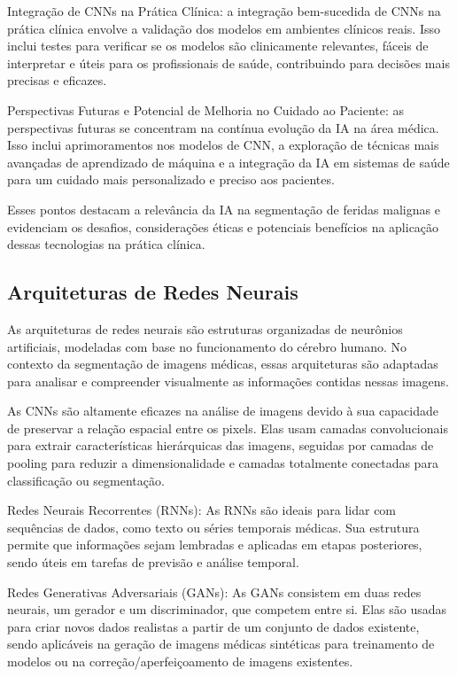 Integração de \ac{CNNs} na Prática Clínica: a integração bem-sucedida de \ac{CNNs} na prática clínica envolve a validação dos modelos em ambientes clínicos reais. Isso inclui testes para verificar se os modelos são clinicamente relevantes, fáceis de interpretar e úteis para os profissionais de saúde, contribuindo para decisões mais precisas e eficazes.

Perspectivas Futuras e Potencial de Melhoria no Cuidado ao Paciente: as perspectivas futuras se concentram na contínua evolução da IA na área médica. Isso inclui aprimoramentos nos modelos de \ac{CNN}, a exploração de técnicas mais avançadas de aprendizado de máquina e a integração da IA em sistemas de saúde para um cuidado mais personalizado e preciso aos pacientes.

Esses pontos destacam a relevância da IA na segmentação de feridas malignas e evidenciam os desafios, considerações éticas e potenciais benefícios na aplicação dessas tecnologias na prática clínica.

\subsection{Arquiteturas de Redes Neurais}

As arquiteturas de redes neurais são estruturas organizadas de neurônios artificiais, modeladas com base no funcionamento do cérebro humano. No contexto da segmentação de imagens médicas, essas arquiteturas são adaptadas para analisar e compreender visualmente as informações contidas nessas imagens.

As \ac{CNNs} são altamente eficazes na análise de imagens devido à sua capacidade de preservar a relação espacial entre os pixels. Elas usam camadas convolucionais para extrair características hierárquicas das imagens, seguidas por camadas de pooling para reduzir a dimensionalidade e camadas totalmente conectadas para classificação ou segmentação.

Redes Neurais Recorrentes (RNNs): As RNNs são ideais para lidar com sequências de dados, como texto ou séries temporais médicas. Sua estrutura permite que informações sejam lembradas e aplicadas em etapas posteriores, sendo úteis em tarefas de previsão e análise temporal.

Redes Generativas Adversariais (GANs): As GANs consistem em duas redes neurais, um gerador e um discriminador, que competem entre si. Elas são usadas para criar novos dados realistas a partir de um conjunto de dados existente, sendo aplicáveis na geração de imagens médicas sintéticas para treinamento de modelos ou na correção/aperfeiçoamento de imagens existentes.

